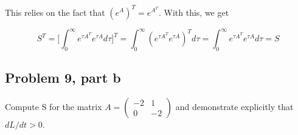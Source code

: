 \begin{solution}
\begin{enumerate}
        This relies on the fact that $(e^{A})^T = e^{A^T}$. With this, we get

        \[
        S^T = \Big[ \int_0^\infty e^{\tau A^T}e^{\tau A} d\tau\Big]^T = \int_0^\infty (e^{\tau A^T}e^{\tau A})^T d\tau = \int_0^\infty e^{\tau A^T}e^{\tau A} d\tau = S
        \]
    \end{enumerate}
\end{solution}

\subsection{Problem 9, part b}
Compute S for the matrix $A = \begin{pmatrix}-2 &1\\ 0 &-2\end{pmatrix}$ and demonstrate explicitly that $dL/dt > 0$.
\partbreak
